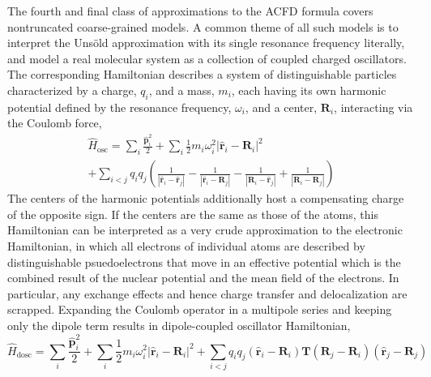 The fourth and final class of approximations to the ACFD formula covers nontruncated coarse-grained models.
A common theme of all such models is to interpret the Unsöld approximation with its single resonance frequency literally, and model a real molecular system as a collection of coupled charged oscillators.
The corresponding Hamiltonian describes a system of distinguishable particles characterized by a charge, $q_i$, and a mass, $m_i$, each having its own harmonic potential defined by the resonance frequency, $\omega_i$, and a center, $\mathbf R_i$, interacting via the Coulomb force,
\begin{multline}
  \hat H_\text{osc}=\sum_i\frac{\mathbf{\hat p}_i^2}2+\sum_i\frac12 m_i\omega_i^2|\mathbf{\hat r}_i-\mathbf R_i|^2 \\
  +\sum_{i<j}q_i q_j\left(
    \frac1{|\mathbf{\hat r}_i-\mathbf{\hat r}_j|}
    -\frac1{|\mathbf{\hat r}_i-\mathbf R_j|}
    -\frac1{|\mathbf R_i-\mathbf{\hat r}_j|}
    +\frac1{|\mathbf R_i-\mathbf R_j|}
  \right)
\end{multline}
The centers of the harmonic potentials additionally host a compensating charge of the opposite sign.
If the centers are the same as those of the atoms, this Hamiltonian can be interpreted as a very crude approximation to the electronic Hamiltonian, in which all electrons of individual atoms are described by distinguishable psuedoelectrons that move in an effective potential which is the combined result of the nuclear potential and the mean field of the electrons.
In particular, any exchange effects and hence charge transfer and delocalization are scrapped.
Expanding the Coulomb operator in a multipole series and keeping only the dipole term results in dipole-coupled oscillator Hamiltonian,
\begin{equation}
  \hat H_\text{dosc}=\sum_i\frac{\mathbf{\hat p}_i^2}2+\sum_i\frac12 m_i\omega_i^2|\mathbf{\hat r}_i-\mathbf R_i|^2+\sum_{i<j}q_i q_j(\mathbf{\hat r}_i-\mathbf R_i)\mathbf T(\mathbf R_j-\mathbf R_i)(\mathbf{\hat r}_j-\mathbf R_j)
  \label{eq:mbd}
\end{equation}


